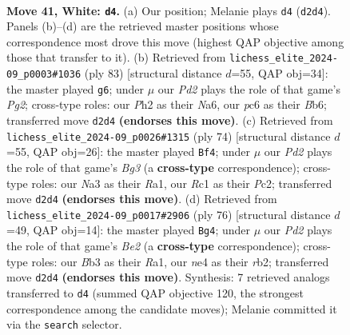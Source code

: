 \documentclass[11pt]{article}
\begin{document}
\clearpage

\begin{figure}[p]\centering
\begin{subfigure}{0.46\textwidth}\centering
\resizebox{\linewidth}{!}{%
\newchessgame
\chessboard[
  setfen={r1b5/p2p2k1/1pp5/5p1p/1PP1nP2/NB6/P2PK2P/2R5 w - - 6 41},
  showmover=false,
  pgfstyle=straightmove, color=movearrow, markmove={d2-d4}
]}
\caption{}
\end{subfigure}\hfill
\begin{subfigure}{0.46\textwidth}\centering
\resizebox{\linewidth}{!}{%
\newchessgame
\chessboard[
  setfen={8/3k2pp/nb3p2/p1p2N2/P1P3P1/BP5P/4K3/8 b - - 0 42},
  showmover=false,
  pgfstyle=straightmove, color=movearrow, markmove={g7-g6}
]}
\caption{}
\end{subfigure}
\\[4pt]
\begin{subfigure}{0.46\textwidth}\centering
\resizebox{\linewidth}{!}{%
\newchessgame
\chessboard[
  setfen={2kb2r1/2p2p2/1p3P1p/p3P3/P7/2P1N1Bb/2P2K2/R7 w - - 0 38},
  showmover=false,
  pgfstyle=straightmove, color=movearrow, markmove={g3-f4}
]}
\caption{}
\end{subfigure}\hfill
\begin{subfigure}{0.46\textwidth}\centering
\resizebox{\linewidth}{!}{%
\newchessgame
\chessboard[
  setfen={7k/1b5p/2p1p3/3pPnP1/3P1B2/7P/1r2B1P1/R4K2 w - - 1 39},
  showmover=false,
  pgfstyle=straightmove, color=movearrow, markmove={e2-g4}
]}
\caption{}
\end{subfigure}
\caption{\textbf{Move 41, White: \texttt{d4}.} (a) Our position; Melanie plays \texttt{d4} (\texttt{d2d4}). Panels (b)--(d) are the retrieved master positions whose correspondence most drove this move (highest QAP objective among those that transfer to it). (b) Retrieved from \texttt{lichess\_elite\_2024-09\_p0003\#1036} (ply 83) [structural distance $d$=55, QAP obj=34]: the master played \texttt{g6}; under $\mu$ our \emph{Pd2} plays the role of that game's \emph{Pg2}; cross-type roles: our \emph{P}h2 as their \emph{N}a6, our \emph{p}c6 as their \emph{B}b6; transferred move \texttt{d2d4} \textbf{(endorses this move)}. (c) Retrieved from \texttt{lichess\_elite\_2024-09\_p0026\#1315} (ply 74) [structural distance $d$=55, QAP obj=26]: the master played \texttt{Bf4}; under $\mu$ our \emph{Pd2} plays the role of that game's \emph{Bg3} (a \textbf{cross-type} correspondence); cross-type roles: our \emph{N}a3 as their \emph{R}a1, our \emph{R}c1 as their \emph{P}c2; transferred move \texttt{d2d4} \textbf{(endorses this move)}. (d) Retrieved from \texttt{lichess\_elite\_2024-09\_p0017\#2906} (ply 76) [structural distance $d$=49, QAP obj=14]: the master played \texttt{Bg4}; under $\mu$ our \emph{Pd2} plays the role of that game's \emph{Be2} (a \textbf{cross-type} correspondence); cross-type roles: our \emph{B}b3 as their \emph{R}a1, our \emph{n}e4 as their \emph{r}b2; transferred move \texttt{d2d4} \textbf{(endorses this move)}. Synthesis: 7 retrieved analogs transferred to \texttt{d4} (summed QAP objective 120, the strongest correspondence among the candidate moves); Melanie committed it via the \texttt{search} selector.}
\label{fig:thought-m80}
\end{figure}
\end{document}
